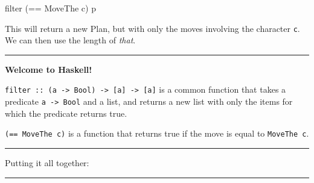 \documentclass[]{article}
\newenvironment{Shaded}{}{}
\newcommand{\KeywordTok}[1]{\textcolor[rgb]{0.00,0.44,0.13}{\textbf{{#1}}}}
\newcommand{\DataTypeTok}[1]{\textcolor[rgb]{0.56,0.13,0.00}{{#1}}}
\newcommand{\OtherTok}[1]{\textcolor[rgb]{0.00,0.44,0.13}{{#1}}}
\newcommand{\FunctionTok}[1]{\textcolor[rgb]{0.02,0.16,0.49}{{#1}}}
\newcommand{\NormalTok}[1]{{#1}}
\begin{document}
\begin{Shaded}
\begin{Highlighting}[]
\NormalTok{filter (}\FunctionTok{==} \DataTypeTok{MoveThe} \NormalTok{c) p}
\end{Highlighting}
\end{Shaded}

This will return a new Plan, but with only the moves involving the character
\texttt{c}. We can then use the length of \emph{that}.

\begin{center}\rule{0.5\linewidth}{\linethickness}\end{center}

\textbf{Welcome to Haskell!}

\texttt{filter\ ::\ (a\ -\textgreater{}\ Bool)\ -\textgreater{}\ {[}a{]}\ -\textgreater{}\ {[}a{]}}
is a common function that takes a predicate \texttt{a\ -\textgreater{}\ Bool}
and a list, and returns a new list with only the items for which the predicate
returns true.

\texttt{(==\ MoveThe\ c)} is a function that returns true if the move is equal
to \texttt{MoveThe\ c}.

\begin{center}\rule{0.5\linewidth}{\linethickness}\end{center}

Putting it all together:

\begin{Shaded}
\end{Shaded}

\begin{center}\rule{0.5\linewidth}{\linethickness}\end{center}
\end{document}
